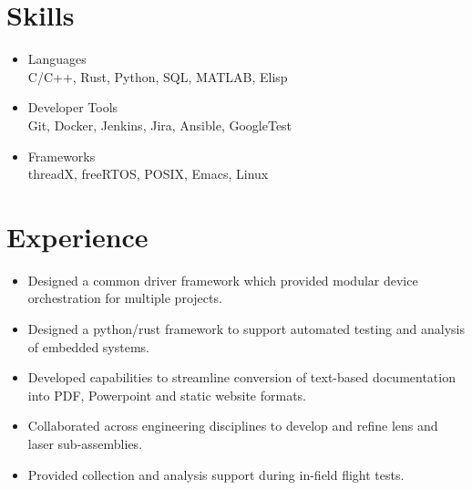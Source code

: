 \documentclass[a4paper,ragged2e,withhyper]{altacv}
\begin{document}
{
\divider



\section{Skills}
\label{sec:orgdad1287}
\begin{itemize}
\item Languages\\
C/C++, Rust, Python, SQL, MATLAB, Elisp\\
\item Developer Tools\\
Git, Docker, Jenkins, Jira, Ansible, GoogleTest\\
\item Frameworks\\
threadX, freeRTOS, POSIX, Emacs, Linux\\
\end{itemize}

}
\section{Experience}
\label{sec:org7b8293c}


\begin{itemize}
\item Designed a common driver framework which provided modular device orchestration for multiple projects.\\
\item Designed a python/rust framework to support automated testing and analysis of embedded systems.\\
\item Developed capabilities to streamline conversion of text-based documentation into PDF, Powerpoint and static website formats.\\
\item Collaborated across engineering disciplines to develop and refine lens and laser sub-assemblies.\\
\item Provided collection and analysis support during in-field flight tests.\\
\end{itemize}
\end{document}
